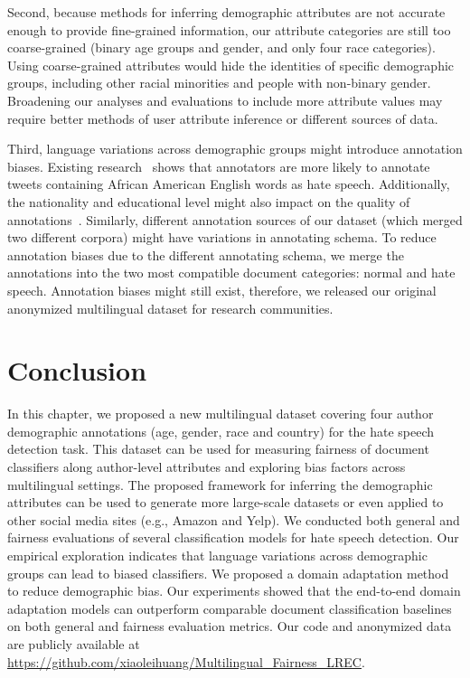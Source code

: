 Second, because methods for inferring demographic attributes are not accurate enough to provide fine-grained information, our attribute categories are still too coarse-grained (binary age groups and gender, and only four race categories).
Using coarse-grained attributes would hide the identities of specific demographic groups, including other racial minorities and people with non-binary gender.
Broadening our analyses and evaluations to include more attribute values may require better methods of user attribute inference or different sources of data.

Third, language variations across demographic groups might introduce annotation biases. Existing research~\cite{sap2019risk} shows that annotators are more likely to annotate tweets containing African American English words as hate speech.
Additionally, the nationality and educational level might also impact on the quality of annotations~\cite{founta2018large}.
Similarly, different annotation sources of our dataset (which merged two different corpora) might have variations in annotating schema.
To reduce annotation biases due to the different annotating schema,
we merge the annotations into the two most compatible document categories: normal and hate speech.
Annotation biases might still exist, therefore, 
we released our original anonymized multilingual dataset for research communities.


\section{Conclusion}

In this chapter, we proposed a new multilingual dataset covering four author demographic annotations (age, gender, race and country) for the hate speech detection task.
This dataset can be used for measuring fairness of document classifiers along author-level attributes and exploring bias factors across multilingual settings.
The proposed framework for inferring the demographic attributes can be used to generate more large-scale datasets or even applied to other social media sites (e.g., Amazon and Yelp).
We conducted both general and fairness evaluations of several classification models for hate speech detection. 
Our empirical exploration indicates that language variations across demographic groups can lead to biased classifiers.
We proposed a domain adaptation method to reduce demographic bias. 
Our experiments showed that the end-to-end domain adaptation models can outperform comparable document classification baselines on both general and fairness evaluation metrics.
Our code and anonymized data are publicly available at \url{https://github.com/xiaoleihuang/Multilingual_Fairness_LREC}.
